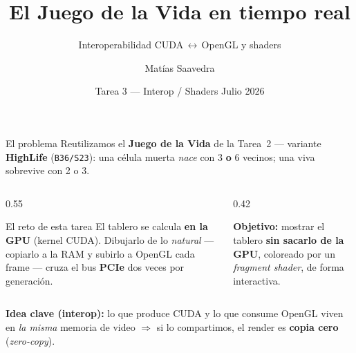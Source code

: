 \documentclass[aspectratio=169]{beamer}
\title{El Juego de la Vida en tiempo real}
\subtitle{Interoperabilidad CUDA\,$\leftrightarrow$\,OpenGL y shaders}
\author{Matías Saavedra}
\institute{CC7515-1 --- Computación en GPU \quad\textbullet\quad U. de Chile}
\date{Tarea 3 --- Interop / Shaders \quad\textbullet\quad Julio 2026}
\begin{document}
\titleframe

\begin{frame}{El problema}
    \small
    Reutilizamos el \textbf{Juego de la Vida} de la Tarea~2 --- variante
    \textbf{HighLife} (\texttt{B36/S23}): una célula muerta \emph{nace} con 3
    \textbf{o} 6 vecinos; una viva sobrevive con 2 o 3.

    \vspace{0.2cm}
    \begin{columns}[T]
        \begin{column}{0.55\textwidth}
            \begin{problock}{El reto de esta tarea}
                El tablero se calcula \textbf{en la GPU} (kernel CUDA). Dibujarlo
                de lo \emph{natural} --- copiarlo a la RAM y subirlo a OpenGL cada
                frame --- cruza el bus \textbf{PCIe} dos veces por generación.
            \end{problock}
        \end{column}
        \begin{column}{0.42\textwidth}
            \begin{highlightbox}
                \textbf{Objetivo:} mostrar el tablero \textbf{sin sacarlo de la
                GPU}, coloreado por un \emph{fragment shader}, de forma interactiva.
            \end{highlightbox}
        \end{column}
    \end{columns}

    \vspace{0.2cm}
    \textbf{Idea clave (interop):} lo que produce CUDA y lo que consume OpenGL
    viven en \emph{la misma} memoria de video $\Rightarrow$ si lo compartimos, el
    render es \textbf{copia cero} (\emph{zero-copy}).
\end{frame}
\end{document}
